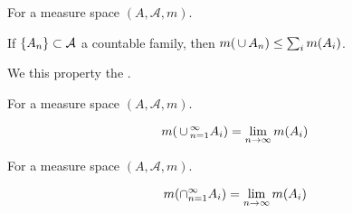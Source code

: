 \begin{prop}
  For a measure space $(A, \mathcal{A}, m)$.

  If $\{A_n\} \subset \mathcal{A}$ a countable family,
  then $m(\,\cup\, A_n) \leq \sum_{i} m(A_i)$.

  We this property the
  .
\end{prop}

\begin{prop}
  For a measure space $(A, \mathcal{A}, m)$.

  $$
    m(\,\cup\,_{n = 1}^{\infty} A_i) = \lim_{n \to \infty} m(A_i)
  $$
\end{prop}

\begin{prop}
  For a measure space $(A, \mathcal{A}, m)$.

  $$
    m(\cap_{n = 1}^{\infty} A_i) = \lim_{n \to \infty} m(A_i)
  $$
\end{prop}


\begin{expl}
\end{expl}
\strats
